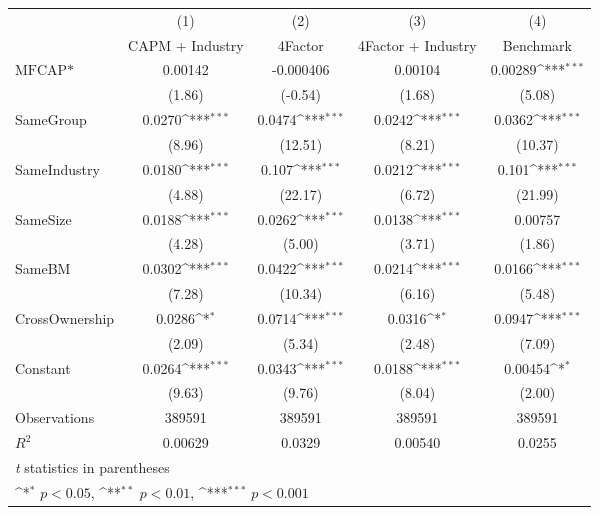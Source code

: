 {
\def\sym#1{\ifmmode^{#1}\else\(^{#1}\)\fi}
\begin{tabular}{l*{4}{c}}
\hline\hline
                    &\multicolumn{1}{c}{(1)}&\multicolumn{1}{c}{(2)}&\multicolumn{1}{c}{(3)}&\multicolumn{1}{c}{(4)}\\
                    &\multicolumn{1}{c}{ CAPM + Industry}&\multicolumn{1}{c}{ 4Factor }&\multicolumn{1}{c}{ 4Factor + Industry}&\multicolumn{1}{c}{ Benchmark}\\
\hline
$ \text{MFCAP*} $   &     0.00142         &   -0.000406         &     0.00104         &     0.00289\sym{***}\\
                    &      (1.86)         &     (-0.54)         &      (1.68)         &      (5.08)         \\
[1em]
SameGroup           &      0.0270\sym{***}&      0.0474\sym{***}&      0.0242\sym{***}&      0.0362\sym{***}\\
                    &      (8.96)         &     (12.51)         &      (8.21)         &     (10.37)         \\
[1em]
SameIndustry        &      0.0180\sym{***}&       0.107\sym{***}&      0.0212\sym{***}&       0.101\sym{***}\\
                    &      (4.88)         &     (22.17)         &      (6.72)         &     (21.99)         \\
[1em]
SameSize            &      0.0188\sym{***}&      0.0262\sym{***}&      0.0138\sym{***}&     0.00757         \\
                    &      (4.28)         &      (5.00)         &      (3.71)         &      (1.86)         \\
[1em]
SameBM              &      0.0302\sym{***}&      0.0422\sym{***}&      0.0214\sym{***}&      0.0166\sym{***}\\
                    &      (7.28)         &     (10.34)         &      (6.16)         &      (5.48)         \\
[1em]
CrossOwnership      &      0.0286\sym{*}  &      0.0714\sym{***}&      0.0316\sym{*}  &      0.0947\sym{***}\\
                    &      (2.09)         &      (5.34)         &      (2.48)         &      (7.09)         \\
[1em]
Constant            &      0.0264\sym{***}&      0.0343\sym{***}&      0.0188\sym{***}&     0.00454\sym{*}  \\
                    &      (9.63)         &      (9.76)         &      (8.04)         &      (2.00)         \\
\hline
Observations        &      389591         &      389591         &      389591         &      389591         \\
$ R^2 $             &     0.00629         &      0.0329         &     0.00540         &      0.0255         \\
\hline\hline
\multicolumn{5}{l}{\footnotesize \textit{t} statistics in parentheses}\\
\multicolumn{5}{l}{\footnotesize \sym{*} \(p<0.05\), \sym{**} \(p<0.01\), \sym{***} \(p<0.001\)}\\
\end{tabular}
}
